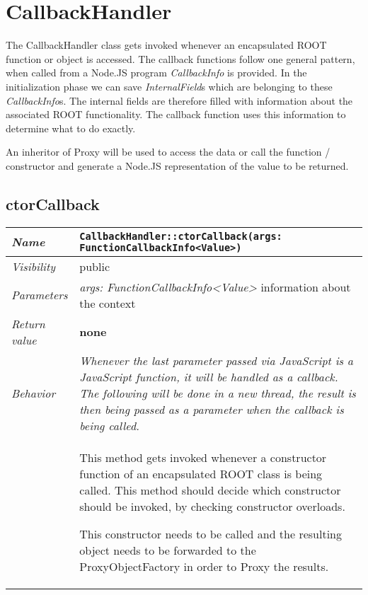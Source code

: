 \chapter{CallbackHandler}
The CallbackHandler class gets invoked whenever an encapsulated ROOT function or object is accessed.
The callback functions follow one general pattern, when called from a Node.JS program \textit{CallbackInfo} is provided.
In the initialization phase we can save \textit{InternalField}s which are belonging to these \textit{CallbackInfo}s.
The internal fields are therefore filled with information about the associated ROOT functionality.
The callback function uses this information to determine what to do exactly.

An inheritor of Proxy will be used to access the data or call the function / constructor and generate a Node.JS representation of the value to be returned.
\section{ctorCallback}
\begin{longtable}{p{3cm} @{\hskip 1cm} p{12cm}}
 \hline
\textit{Name} & \texttt{CallbackHandler::ctorCallback(args: FunctionCallbackInfo<Value>)}\\
\hline
 \textit{Visibility} & public\\
\hline
\textit{Parameters} & \textit{args: FunctionCallbackInfo<Value>} information about the context\\
\hline
\textit{Return value} & \textbf{none}\\
  \hline
 \textit{Behavior} &
 \textit{Whenever the last parameter passed via JavaScript is a JavaScript function, it will be handled as a callback. The following will be done in a new thread, the result is then being passed as a parameter when the callback is being called.}\\

 & This method gets invoked whenever a constructor function of an encapsulated ROOT class is being called.
 This method should decide which constructor should be invoked, by checking constructor overloads.

 This constructor needs to be called and the resulting object needs to be forwarded to the ProxyObjectFactory in order to Proxy the results.\\
\hline
\end{longtable}
